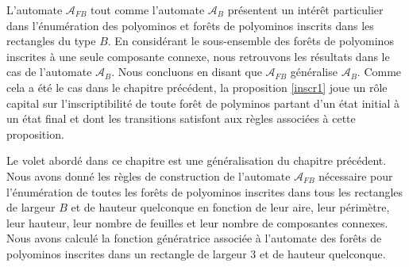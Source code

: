  
 
 L'automate $\mathcal{A}_{FB}$ tout comme l'automate $\mathcal{A}_{B}$ présentent un intérêt particulier dans l'énumération des polyominos et forêts de polyominos inscrits dans les rectangles du type $B$. En considérant le sous-ensemble des forêts de polyominos inscrites à une seule composante connexe, nous retrouvons les résultats dans le cas de l’automate $\mathcal{A}_{B}$. Nous concluons en disant  que $\mathcal{A}_{FB}$  généralise $\mathcal{A}_{B}.$ Comme cela a été le cas dans le chapitre précédent, la proposition \ref{inscr1} joue un rôle capital sur  l'inscriptibilité de toute forêt de polyminos partant d'un état initial à un état final et dont les transitions satisfont  aux règles associées à cette proposition.
 
 
 Le volet abordé dans ce chapitre est  une généralisation du chapitre précédent. Nous avons donné les règles de construction de l'automate $\mathcal{A}_{FB}$ nécessaire pour l'énumération de toutes les forêts de polyominos inscrites dans tous les rectangles de largeur $B$ et de hauteur quelconque en fonction de leur aire, leur périmètre, leur hauteur, leur nombre de feuilles et leur nombre de composantes connexes. Nous avons calculé la fonction génératrice associée à l'automate des forêts de polyominos inscrites dans un rectangle de largeur $3$ et de hauteur quelconque.